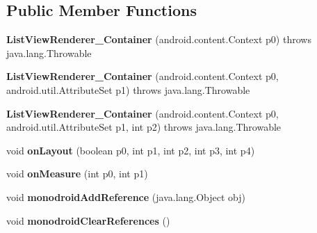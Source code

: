 \subsection*{Public Member Functions}
\begin{DoxyCompactItemize}
\item 
\mbox{\label{classmd5b60ffeb829f638581ab2bb9b1a7f4f3f_1_1ListViewRenderer__Container_a960e9091cd0ede6811fa2f774ac998a3}} 
{\bfseries List\+View\+Renderer\+\_\+\+Container} (android.\+content.\+Context p0)  throws java.\+lang.\+Throwable 	
\item 
\mbox{\label{classmd5b60ffeb829f638581ab2bb9b1a7f4f3f_1_1ListViewRenderer__Container_a079f089bf8a9f4a35ec59ce04abb3d98}} 
{\bfseries List\+View\+Renderer\+\_\+\+Container} (android.\+content.\+Context p0, android.\+util.\+Attribute\+Set p1)  throws java.\+lang.\+Throwable 	
\item 
\mbox{\label{classmd5b60ffeb829f638581ab2bb9b1a7f4f3f_1_1ListViewRenderer__Container_af8b2fbe4aa6217fcb86a29f17c80199b}} 
{\bfseries List\+View\+Renderer\+\_\+\+Container} (android.\+content.\+Context p0, android.\+util.\+Attribute\+Set p1, int p2)  throws java.\+lang.\+Throwable 	
\item 
\mbox{\label{classmd5b60ffeb829f638581ab2bb9b1a7f4f3f_1_1ListViewRenderer__Container_ab2f05621c7c998e3bdbfbef1a0e32fad}} 
void {\bfseries on\+Layout} (boolean p0, int p1, int p2, int p3, int p4)
\item 
\mbox{\label{classmd5b60ffeb829f638581ab2bb9b1a7f4f3f_1_1ListViewRenderer__Container_a9ef651c952dc03df56f4c0fbe827df8d}} 
void {\bfseries on\+Measure} (int p0, int p1)
\item 
\mbox{\label{classmd5b60ffeb829f638581ab2bb9b1a7f4f3f_1_1ListViewRenderer__Container_ad6e3e1a3e209add1fbe6dcc4c6971ba7}} 
void {\bfseries monodroid\+Add\+Reference} (java.\+lang.\+Object obj)
\item 
\mbox{\label{classmd5b60ffeb829f638581ab2bb9b1a7f4f3f_1_1ListViewRenderer__Container_ae29fb9368e6d471c74594d384760ab12}} 
void {\bfseries monodroid\+Clear\+References} ()
\end{DoxyCompactItemize}
